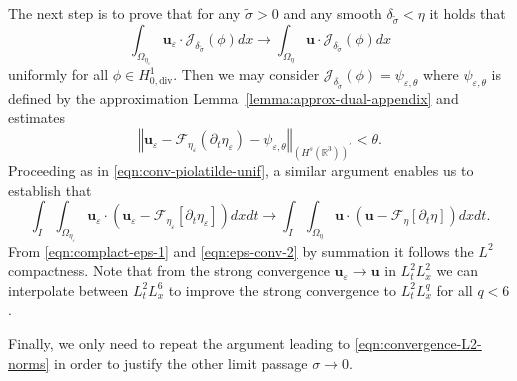 \documentclass[10pt,a4paper]{article}
\numberwithin{equation}{section}
\begin{document}
The next step is to prove that for any $\tilde{\sigma}>0$ and any smooth $\delta_{\tilde{\sigma}}<\eta$ it holds that 
\begin{equation}
\int_{\Omega_{\eta_{\varepsilon}}}\mathbf{u}_{\varepsilon}\cdot\mathcal{J}_{\delta_{\tilde{\sigma}}}\left(\phi\right)dx\to\int_{\Omega_{\eta}}\mathbf{u}\cdot\mathcal{J}_{\delta_{\tilde{\sigma}}}\left(\phi\right)dx
\end{equation}
uniformly for all $\phi \in H_{0,\text{div}}^{1}$.
Then we may consider $\mathcal{J}_{\delta_{\tilde{\sigma}}}\left(\phi\right)=\psi_{\varepsilon,\theta}$ where $\psi_{\varepsilon,\theta}$ is defined by the approximation Lemma~\ref{lemma:approx-dual-appendix} and estimates 
\[
\left\Vert \mathbf{u}_{\varepsilon}-\mathcal{F}_{\eta_{\varepsilon}}\left(\partial_{t}\eta_{\varepsilon}\right)-\psi_{\varepsilon,\theta}\right\Vert _{\left(H^{s}\left(\mathbb{R}^{3}\right)\right)^{\prime}}<\theta.
\]
Proceeding as in \eqref{eqn:conv-piolatilde-unif}, a similar argument enables us to establish that
\begin{equation}\label{eqn:eps-conv-2}
\int_{I}\int_{\Omega_{\eta_{\varepsilon}}}\mathbf{u}_{\varepsilon}\cdot\left(\mathbf{u}_{\varepsilon}-\mathcal{F}_{\eta_{\varepsilon}}\left[\partial_{t}\eta_{\varepsilon}\right]\right)dxdt\to\int_{I}\int_{\Omega_{\eta}}\mathbf{u}\cdot\left(\mathbf{u}-\mathcal{F}_{\eta}\left[\partial_{t}\eta\right]\right)dxdt.
\end{equation}
From \eqref{eqn:complact-eps-1} and \eqref{eqn:eps-conv-2} by summation 
it follows the $L^{2}$ compactness. Note that from the strong convergence $\mathbf{u}_{\varepsilon}\to\mathbf{u}$ in $L^{2}_{t}L^{2}_{x}$ we can interpolate between $L^{2}_{t}L^{6}_{x}$ to improve the strong convergence to $L^{2}_{t}L^{q}_{x}$ for all $q<6$.

Finally, we only need to repeat the argument leading to \eqref{eqn:convergence-L2-norms} in order to justify the other limit passage  $\sigma \to 0$.
\end{document}
